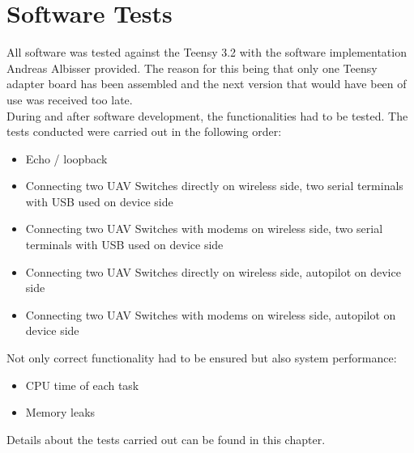 \section{Software Tests}
All software was tested against the Teensy 3.2 with the software implementation Andreas Albisser provided. The reason for this being that only one Teensy adapter board has been assembled and the next version that would have been of use was received too late.\\
During and after software development, the functionalities had to be tested. The tests conducted were carried out in the following order:
\begin{itemize}
    \item Echo / loopback
    \item Connecting two UAV Switches directly on wireless side, two serial terminals with USB used on device side
    \item Connecting two UAV Switches with modems on wireless side, two serial terminals with USB used on device side
    \item Connecting two UAV Switches directly on wireless side, autopilot on device side
    \item Connecting two UAV Switches with modems on wireless side, autopilot on device side
\end{itemize}
Not only correct functionality had to be ensured but also system performance:
\begin{itemize}
    \item CPU time of each task
    \item Memory leaks
\end{itemize}
Details about the tests carried out can be found in this chapter.
%
%
%

